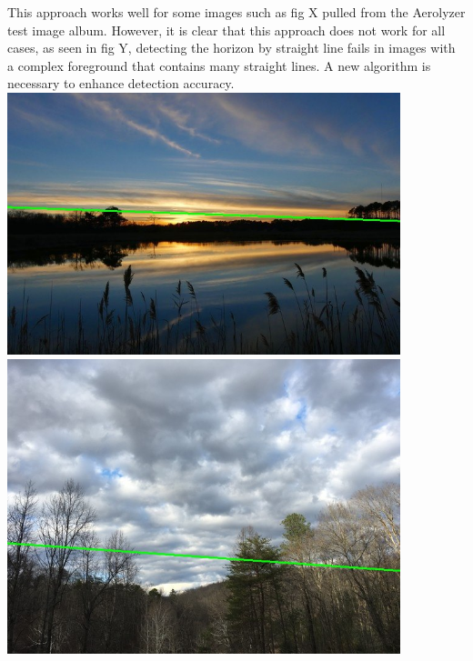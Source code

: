 \documentclass[onecolumn, draftclsnofoot,10pt, compsoc]{IEEEtran}
\begin{document}
\begin{singlespace}
				This approach works well for some images such as fig X pulled from the Aerolyzer test image album. However, it is clear that this approach does not work for all cases, as seen in fig Y, detecting the horizon by straight line fails in images with a complex foreground that contains many straight lines. A new algorithm is necessary to enhance detection accuracy.
				\\
				\includegraphics[width=4.5in,natwidth=640,natheight=427]{images/line1.jpg}
				\\
 				\includegraphics[width=4.5in,natwidth=640,natheight=480]{images/line2.jpg}


\end{singlespace}
\end{document}
